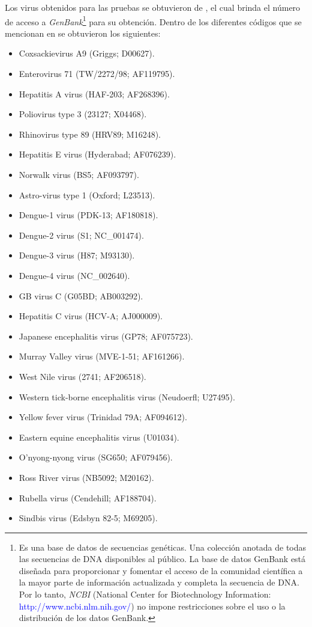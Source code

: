 \documentclass[12pt,a4paper,spanish]{article}
\begin{document}
		\par Los virus obtenidos para las pruebas se obtuvieron de \cite{holmes}, el cual brinda el número de acceso a 			\textit{GenBank}\footnote{Es una base de datos de secuencias genéticas. Una colección anotada de todas las 			secuencias de DNA disponibles al público. La base de datos GenBank está diseñada para proporcionar y fomentar el 			acceso de la comunidad científica a la mayor parte de información actualizada y completa la secuencia de DNA. Por 			lo tanto, \textit{NCBI} (National Center for Biotechnology Information:
		\textcolor{blue}{http://www.ncbi.nlm.nih.gov/}) no impone restricciones sobre el uso o la distribución de los 			datos GenBank.} para su obtención. Dentro de los diferentes códigos que se mencionan en \cite{holmes} se 			obtuvieron los siguientes:

		\begin{itemize}
			\item Coxsackievirus A9 (Griggs; \textsc{D00627}).
			\item Enterovirus 71 (TW/2272/98; \textsc{AF119795}).
			\item Hepatitis A virus (HAF-203; \textsc{AF268396}).
			\item Poliovirus type 3 (23127; \textsc{X04468}).
			\item Rhinovirus type 89 (HRV89; \textsc{M16248}).
			\item Hepatitis E virus (Hyderabad; \textsc{AF076239}).
			\item Norwalk virus (BS5; \textsc{AF093797}).
			\item Astro-virus type 1 (Oxford; \textsc{L23513}).
			\item Dengue-1 virus (PDK-13; \textsc{AF180818}).
			\item Dengue-2 virus (S1; \textsc{NC\_001474}).
			\item Dengue-3 virus (H87; \textsc{M93130}).
			\item Dengue-4 virus (\textsc{NC\_002640}).
			\item GB virus C (G05BD; \textsc{AB003292}).
			\item Hepatitis C virus (HCV-A; \textsc{AJ000009}).
			\item Japanese encephalitis virus (GP78; \textsc{AF075723}).
			\item Murray Valley virus (MVE-1-51; \textsc{AF161266}).
			\item West Nile virus (2741; \textsc{AF206518}).
			\item Western tick-borne encephalitis virus (Neudoerfl; \textsc{U27495}).
			\item Yellow fever virus (Trinidad 79A; \textsc{AF094612}).
			\item Eastern equine encephalitis virus (\textsc{U01034}).
			\item O’nyong-nyong virus (SG650; \textsc{AF079456}).
			\item Ross River virus (NB5092; \textsc{M20162}).
			\item Rubella virus (Cendehill; \textsc{AF188704}).
			\item Sindbis virus (Edsbyn 82-5; \textsc{M69205}).
		\end{itemize}
\end{document}
